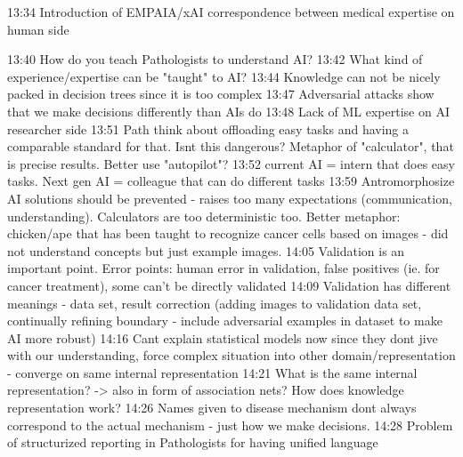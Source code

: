 13:34 Introduction of EMPAIA/xAI
correspondence between medical expertise on human side

13:40 How do you teach Pathologists to understand AI?
13:42 What kind of experience/expertise can be "taught" to AI?
13:44 Knowledge can not be nicely packed in decision trees since it is too complex
13:47 Adversarial attacks show that we make decisions differently than AIs do
13:48 Lack of ML expertise on AI researcher side
13:51 Path think about offloading easy tasks and having a comparable standard for that. Isnt this dangerous? Metaphor of "calculator", that is precise results. Better use "autopilot"?
13:52 current AI = intern that does easy tasks. Next gen AI = colleague that can do different tasks
13:59 Antromorphosize AI solutions should be prevented - raises too many expectations (communication, understanding). Calculators are too deterministic too. 
Better metaphor: chicken/ape that has been taught to recognize cancer cells based on images - did not understand concepts but just example images.
14:05 Validation is an important point. Error points: human error in validation, false positives (ie. for cancer treatment), some  can't be directly validated
14:09 Validation has different meanings - data set, result correction (adding images to validation data set, continually refining boundary - include adversarial examples in dataset to make AI more robust)
14:16 Cant explain statistical models now since they dont jive with our understanding, force complex situation into other domain/representation - converge on same internal representation
14:21 What is the same internal representation? -> also in form of association nets? How does knowledge representation work?
14:26 Names given to disease mechanism dont always correspond to the actual mechanism - just how we make decisions.
14:28 Problem of structurized reporting in Pathologists for having unified language